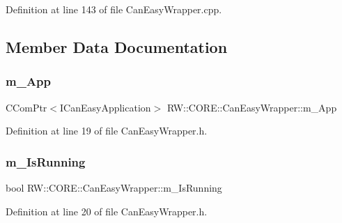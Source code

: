 Definition at line 143 of file Can\+Easy\+Wrapper.\+cpp.



\subsection{Member Data Documentation}
\hypertarget{class_r_w_1_1_c_o_r_e_1_1_can_easy_wrapper_a263279df123f2f05d2752ccf6c62da18}{}\label{class_r_w_1_1_c_o_r_e_1_1_can_easy_wrapper_a263279df123f2f05d2752ccf6c62da18} 
\subsubsection{\texorpdfstring{m\+\_\+\+App}{m\_App}}
{\footnotesize\ttfamily C\+Com\+Ptr$<$I\+Can\+Easy\+Application$>$ R\+W\+::\+C\+O\+R\+E\+::\+Can\+Easy\+Wrapper\+::m\+\_\+\+App\hspace{0.3cm}{\ttfamily [private]}}



Definition at line 19 of file Can\+Easy\+Wrapper.\+h.

\hypertarget{class_r_w_1_1_c_o_r_e_1_1_can_easy_wrapper_a6bc2ad0752071fe7495bc971946a5a58}{}\label{class_r_w_1_1_c_o_r_e_1_1_can_easy_wrapper_a6bc2ad0752071fe7495bc971946a5a58} 
\subsubsection{\texorpdfstring{m\+\_\+\+Is\+Running}{m\_IsRunning}}
{\footnotesize\ttfamily bool R\+W\+::\+C\+O\+R\+E\+::\+Can\+Easy\+Wrapper\+::m\+\_\+\+Is\+Running\hspace{0.3cm}{\ttfamily [private]}}



Definition at line 20 of file Can\+Easy\+Wrapper.\+h.

\hypertarget{class_r_w_1_1_c_o_r_e_1_1_can_easy_wrapper_ac2ed85324d592c81e797426cef3d600e}{}\label{class_r_w_1_1_c_o_r_e_1_1_can_easy_wrapper_ac2ed85324d592c81e797426cef3d600e} 

